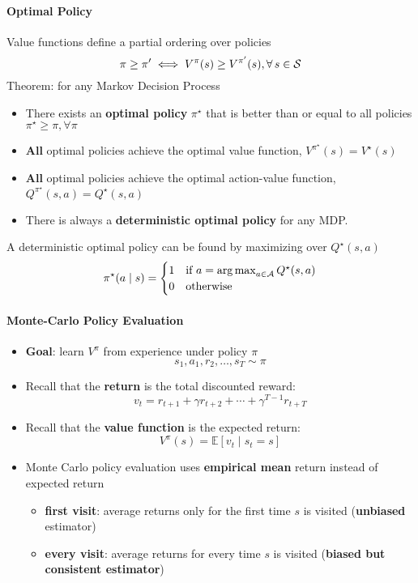 \paragraph{Optimal Policy} Value functions define a partial ordering over policies
\[
    \pi \geq \pi ' \iff V^{\pi }(s)\geq V^{\pi'}(s), \forall s\in \Sc
\]
Theorem: for any Markov Decision Process
\begin{itemize}
    \item There exists an \textbf{optimal policy} $\pi ^{\star} $ that is better than or equal to all policies $\pi ^{\star}\geq \pi,\forall \pi  $
    \item \textbf{All} optimal policies achieve the optimal value function, $V^{\pi ^{\star} }(s) = V^{\star}(s)$
    \item \textbf{All} optimal policies achieve the optimal action-value function, $Q^{\pi ^{\star} }(s,a) = Q^{\star}(s,a)$
    \item There is always a \textbf{deterministic optimal policy} for any MDP.
\end{itemize}
A deterministic optimal policy can be found by maximizing over $Q^{\star}(s,a) $
\[
    \pi ^{\star}(a\mid s) = \begin{cases}
        1 & \text{if } a = \operatorname*{arg\,max}_{a\in \mathcal{A}} Q^{\star}(s,a) \\
        0 & \text{otherwise}
    \end{cases} 
\]

\paragraph{Monte-Carlo Policy Evaluation}
\begin{itemize}
    \item \textbf{Goal}: learn $V^{\pi}$ from experience under policy $\pi$
    \[
    s_{1}, a_{1}, r_{2}, \ldots, s_{T} \sim \pi
    \]
    \item Recall that the \textbf{return} is the total discounted reward:
    \[
    v_{t}=r_{t+1}+\gamma r_{t+2}+\cdots+\gamma^{T-1} r_{t+T}
    \]
    \item Recall that the \textbf{value function} is the expected return:
    \[
    V^{\pi}(s)=\mathbb{E}\left[v_{t} \mid s_{t}=s\right]
    \]
    \item Monte Carlo policy evaluation uses \textbf{empirical mean} return instead of expected return
    \begin{itemize}
        \item \textbf{first visit}: average returns only for the first time $s$ is visited (\textbf{unbiased} estimator)
        \item \textbf{every visit}: average returns for every time $s$ is visited (\textbf{biased but consistent estimator})
    \end{itemize}
\end{itemize}

